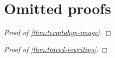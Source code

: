 \section{Omitted proofs}
\label{app:omitted-proofs}

\begin{proof}[Proof of \cref{thm:termtohyp-image}]
    
\end{proof}

\begin{proof}[Proof of \cref{thm:traced-rewriting}]
    
\end{proof}